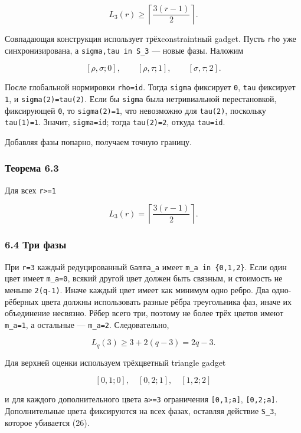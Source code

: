 \[
L_3(r)\ge\left\lceil\frac{3(r-1)}2\right\rceil.
\tag{22}
\]

Совпадающая конструкция использует трёхconstraintный gadget. Пусть
\texttt{rho} уже синхронизирована, а \texttt{sigma,tau\ in\ S\_3} ---
новые фазы. Наложим

\[
[\rho,\sigma;0],
\qquad
[\rho,\tau;1],
\qquad
[\sigma,\tau;2].
\tag{23}
\]

После глобальной нормировки \texttt{rho=id}. Тогда \texttt{sigma}
фиксирует \texttt{0}, \texttt{tau} фиксирует \texttt{1}, и
\texttt{sigma(2)=tau(2)}. Если бы \texttt{sigma} была нетривиальной
перестановкой, фиксирующей \texttt{0}, то \texttt{sigma(2)=1}, что
невозможно для \texttt{tau(2)}, поскольку \texttt{tau(1)=1}. Значит,
\texttt{sigma=id}; тогда \texttt{tau(2)=2}, откуда \texttt{tau=id}.

Добавляя фазы попарно, получаем точную границу.

\hypertarget{ux442ux435ux43eux440ux435ux43cux430-6.3}{%
\subsubsection{Теорема
6.3}\label{ux442ux435ux43eux440ux435ux43cux430-6.3}}

Для всех \texttt{r\textgreater{}=1}

\[
\boxed{
L_3(r)=\left\lceil\frac{3(r-1)}2\right\rceil.
}
\tag{24}
\]

\hypertarget{ux442ux440ux438-ux444ux430ux437ux44b}{%
\subsubsection{6.4 Три
фазы}\label{ux442ux440ux438-ux444ux430ux437ux44b}}

При \texttt{r=3} каждый редуцированный \texttt{Gamma\_a} имеет
\texttt{m\_a\ in\ \{0,1,2\}}. Если один цвет имеет \texttt{m\_a=0},
всякий другой цвет должен быть связным, и стоимость не меньше
\texttt{2(q-1)}. Иначе каждый цвет имеет как минимум одно ребро. Два
одно-рёберных цвета должны использовать разные рёбра треугольника фаз,
иначе их объединение несвязно. Рёбер всего три, поэтому не более трёх
цветов имеют \texttt{m\_a=1}, а остальные --- \texttt{m\_a=2}.
Следовательно,

\[
L_q(3)\ge3+2(q-3)=2q-3.
\tag{25}
\]

Для верхней оценки используем трёхцветный triangle gadget

\[
[0,1;0],\quad[0,2;1],\quad[1,2;2]
\tag{26}
\]

и для каждого дополнительного цвета \texttt{a\textgreater{}=3}
ограничения \texttt{{[}0,1;a{]}}, \texttt{{[}0,2;a{]}}. Дополнительные
цвета фиксируются на всех фазах, оставляя действие \texttt{S\_3},
которое убивается (26).

